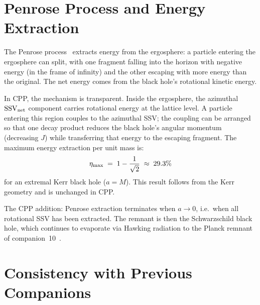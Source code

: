 \documentclass[12pt]{article}
\newcommand{\SSV}{\mathrm{SSV}}
\begin{document}
\section{Penrose Process and Energy Extraction}
\label{sec:penrose}

The Penrose process~\cite{penrose1969} extracts energy from the
ergosphere: a particle entering the ergosphere can split, with one
fragment falling into the horizon with negative energy (in the frame
of infinity) and the other escaping with more energy than the original.
The net energy comes from the black hole's rotational kinetic energy.

In CPP, the mechanism is transparent.  Inside the ergosphere, the
azimuthal $\SSV_{\rm net}$ component carries rotational energy at
the lattice level.  A particle entering this region couples to the
azimuthal SSV; the coupling can be arranged so that one decay product
reduces the black hole's angular momentum (decreasing $J$) while
transferring that energy to the escaping fragment.  The maximum
energy extraction per unit mass is:
\begin{equation}
  \eta_{\rm max} \;=\; 1 - \frac{1}{\sqrt{2}}
  \;\approx\; 29.3\%
  \label{eq:penrose_eta}
\end{equation}
for an extremal Kerr black hole ($a = M$).  This result follows from
the Kerr geometry and is unchanged in CPP.

The CPP addition: Penrose extraction terminates when $a \to 0$, i.e.\
when all rotational SSV has been extracted.  The remnant is then the
Schwarzschild black hole, which continues to evaporate via Hawking
radiation to the Planck remnant of companion~10~\cite{c10}.

\section{Consistency with Previous Companions}
\label{sec:consistency}
\end{document}

